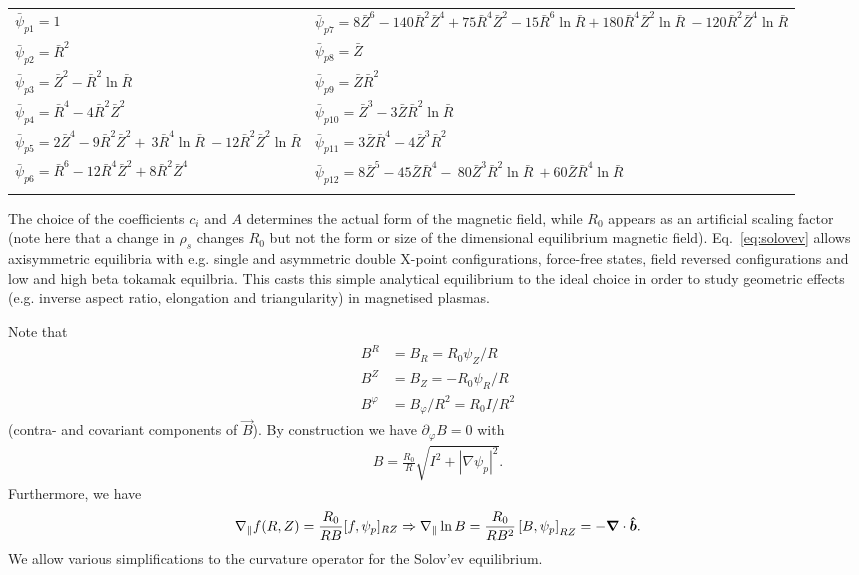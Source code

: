 \begin{longtable}{>{\RaggedRight}p{7cm}>{\RaggedRight}p{7cm}}
\toprule
  $\bar{\psi}_{p1}=1$
  & $\bar{\psi}_{p7}=8\bar{Z}^6 -140 \bar{R}^2 \bar{Z}^4
                      + 75 \bar{R}^4 \bar{Z}^2 - 15\bar{R}^6\ln{\bar{R}}+ 180 \bar{R}^4 \bar{Z}^2 \ln{\bar{R}} \
                       -120 \bar{R}^2 \bar{Z}^4 \ln{\bar{R}}$\\
%
  $\bar{\psi}_{p2}=\bar{R}^2$ &
  $\bar{\psi}_{p8}=\bar{Z}$ \\
%
  $\bar{\psi}_{p3}=\bar{Z}^2 - \bar{R}^2 \ln{\bar{R}}$ &
  $\bar{\psi}_{p9}=\bar{Z}  \bar{R}^2$\\
%
  $\bar{\psi}_{p4}=\bar{R}^4 -4\bar{R}^2\bar{Z}^2$ &
  $\bar{\psi}_{p10}=\bar{Z}^3 - 3 \bar{Z} \bar{R}^2 \ln{\bar{R}}$\\
  $\bar{\psi}_{p5}=2\bar{Z}^4 - 9 \bar{R}^2\bar{Z}^2 + \
                     3 \bar{R}^4 \ln{\bar{R}} \
                    -12  \bar{R}^2\bar{Z}^2 \ln{\bar{R}}$
  &
$\bar{\psi}_{p11}=3 \bar{Z}\bar{R}^4 - 4\bar{Z}^3\bar{R}^2$\\
%
  $\bar{\psi}_{p6}=\bar{R}^6 -12 \bar{R}^4 \bar{Z}^2
                     + 8  \bar{R}^2 \bar{Z}^4$ &
  $\bar{\psi}_{p12}= 8 \bar{Z}^5 -45 \bar{Z} \bar{R}^4 - \
                       80 \bar{Z}^3 \bar{R}^2\ln{\bar{R}} \
                       +60 \bar{Z} \bar{R}^4\ln{\bar{R}}$ \\
   & \\
\bottomrule
\end{longtable}
The choice of the coefficients \(c_{i}\) and \(A\) determines the actual form of the magnetic field, while $R_0$ appears as an artificial scaling factor (note here that a change in $\rho_s$ changes $R_0$ but not the form or size of the dimensional equilibrium magnetic field).
Eq.~\eqref{eq:solovev} allows axisymmetric equilibria with e.g. single and asymmetric double X-point configurations, force-free states,
field reversed configurations and low and high beta tokamak equilbria. This casts this simple analytical equilibrium to the ideal choice in order to study geometric effects (e.g. inverse aspect ratio, elongation and triangularity) in magnetised plasmas.

Note that
\begin{align}
    B^R&=B_R = R_0\psi_Z/R \\
    B^Z&=B_Z = - R_0\psi_R/R \\
    B^\varphi &= B_\varphi/R^2 = R_0I/R^2
\end{align}
(contra- and covariant components of $\vec B$).
By construction we have $\partial_\varphi B = 0$ with
\begin{align}
  B = \frac{R_0}{R}\sqrt{ {I^2 + |\nabla \psi_p|^2}}.
    \label{}
\end{align}
Furthermore, we have
\begin{align}
  \nabla_\parallel f(R,Z) = \frac{R_0}{RB}[f,\psi_p]_{RZ}\Rightarrow \nabla_\parallel \ln B = \frac{R_0}{RB^2}\left[B, \psi_p\right]_{RZ} = -{\boldsymbol{\nabla}}\cdot\bm{\hat{b}}.
\end{align}
We allow various simplifications to the curvature operator
for the Solov'ev equilibrium.

